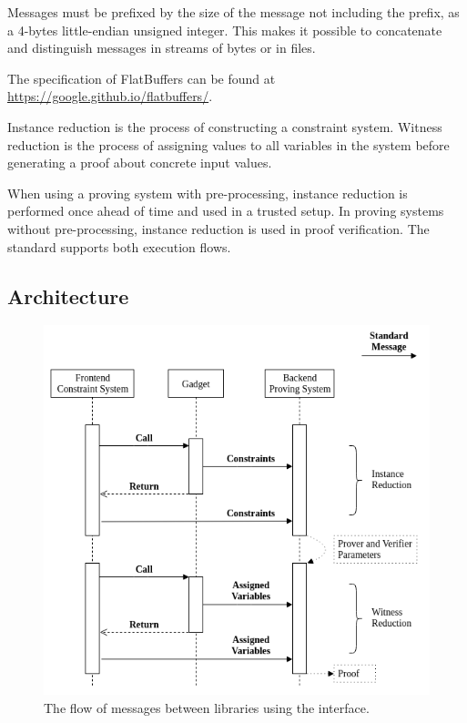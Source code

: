 	Messages must be prefixed by the size of the message not including the prefix,
	as a 4-bytes little-endian unsigned integer.
	This makes it possible to concatenate and distinguish messages
	in streams of bytes or in files.

	The specification of FlatBuffers can be found at
	\href{https://google.github.io/flatbuffers/}{https://google.github.io/flatbuffers/}.



	Instance reduction is the process of constructing a constraint system.
	Witness reduction is the process of assigning values to all variables
	in the system before generating a proof about concrete input values.

	When using a proving system with pre-processing, instance reduction
	is performed once ahead of time and used in a trusted setup.
	In proving systems without pre-processing, instance reduction is used in proof verification.
	The standard supports both execution flows.


\subsection{Architecture}

\begin{figure}[!h]
	\centering
	\includegraphics[width=\linewidth]{graphics/call_flow.png}
	\caption{The flow of messages between libraries using the interface.}
	\label{fig:flow}
\end{figure}


